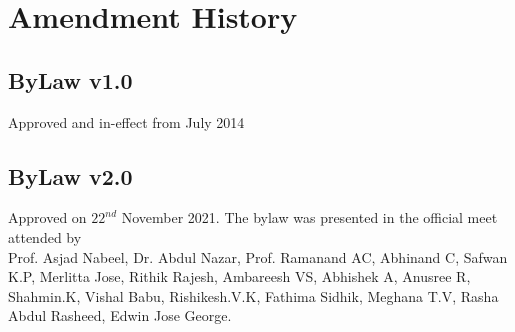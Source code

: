 \section{Amendment History}
\subsection*{ByLaw v1.0}
	Approved and in-effect from July 2014
\subsection*{ByLaw v2.0}
	Approved on $22^{nd}$ November 2021. The bylaw was presented in the official meet attended by \\
	Prof. Asjad Nabeel, Dr. Abdul Nazar, Prof. Ramanand AC, Abhinand C, Safwan K.P, Merlitta Jose, Rithik Rajesh, Ambareesh VS, Abhishek A, Anusree R, Shahmin.K, Vishal Babu, Rishikesh.V.K, Fathima Sidhik, Meghana T.V, Rasha Abdul Rasheed, Edwin Jose George.
